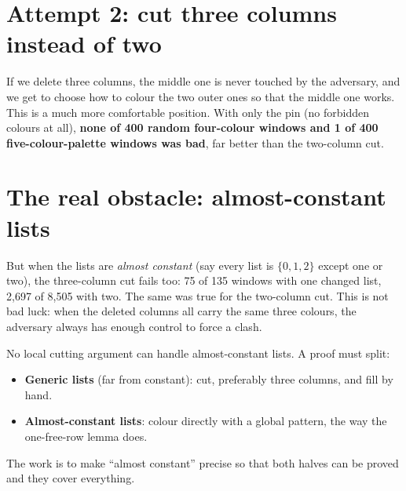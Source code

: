 \documentclass[11pt,oneside,openany]{book}
\begin{document}
\section{Attempt 2: cut three columns instead of two}

\begin{center}
\end{center}

If we delete three columns, the middle one is never touched by the adversary, and we get to choose
how to colour the two outer ones so that the middle one works. This is a much more comfortable
position. With only the pin (no forbidden colours at all), \textbf{none of 400 random four-colour
windows and 1 of 400 five-colour-palette windows was bad}, far better than the two-column cut.

\section{The real obstacle: almost-constant lists}

But when the lists are \emph{almost constant} (say every list is $\{0,1,2\}$ except one or two),
the three-column cut fails too: 75 of 135 windows with one changed list, 2,697 of 8,505 with two.
The same was true for the two-column cut. This is not bad luck: when the deleted columns all carry
the same three colours, the adversary always has enough control to force a clash.

\begin{keyidea}
No local cutting argument can handle almost-constant lists. A proof must split:
\begin{itemize}
\item \textbf{Generic lists} (far from constant): cut, preferably three columns, and fill by hand.
\item \textbf{Almost-constant lists}: colour directly with a global pattern, the way the
one-free-row lemma does.
\end{itemize}
The work is to make ``almost constant'' precise so that both halves can be proved and they cover
everything.
\end{keyidea}
\end{document}
